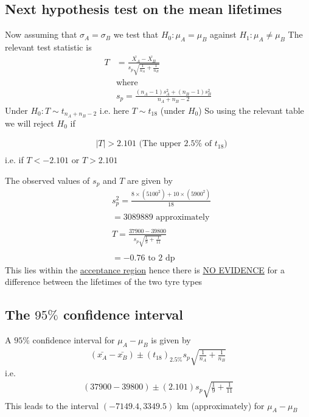 \documentclass[11pt]{article}
\begin{document}
\subsection{Next hypothesis test on the mean lifetimes}
Now assuming that $\sigma_{A}=\sigma_{B}$ we test that $H_{0}: \mu_{A} = \mu_{B}$ against $H_{1}: \mu_{A} \neq \mu_{B}$ The relevant test statistic is
\begin{align*}
  T &= \frac{\bar{X_{A}}-\bar{X_{B}}} {s_{p}\sqrt{\frac{1}{n_{A}}+\frac{1}{n_{B}}}} \\
  & \text{where} \\
  & s_{p} = \frac{(n_{A}-1)s_{A}^{2} +(n_{B}-1)s_{B}^{2} }{n_{A}+n_{B}-2}
\end{align*}
Under $H_{0}: T \sim t_{n_{A}+n_{B}-2}$ i.e. here $T \sim t_{18}$ (under $H_{0}$)
So using the relevant table we will reject $H_{0}$ if

\begin{align*}
  & \lvert T \rvert >2.101 \text{ (The upper $2.5\% $ of $t_{18}$)} \\
\end{align*}
   i.e. if $T<-2.101$ or $T>2.101$

The observed values of $s_{p}$ and $T$ are given by
\begin{align*}
  & s_{p}^{2} = \frac{8 \times (5100^{2}) + 10 \times (5900^{2})}{18} \\ \\
              &= 3089889 \text{ approximately} \\ \\
  & T = \frac{37900-39800}{s_{p} \sqrt{\frac{1}{9} + \frac{1}{11}}} \\ \\
  &= -0.76 \text{ to 2 dp}
\end{align*}
This lies within the \underline{acceptance region} hence there is \underline{NO EVIDENCE} for a difference between the lifetimes of the two tyre types

\subsection{The $95\%$ confidence interval}
A  $95\%$ confidence interval for $\mu_{A} - \mu_{B}$ is given by
\begin{align}
  (\bar{x_{A}} - \bar{x_{B}}) \pm (t_{18})_{2.5\%}s_{p}\sqrt{\frac{1}{n_{A}}+\frac{1}{n_{B}}}
\end{align}
i.e.
\begin{align}
  (37900-39800) \pm (2.101)s_{p}\sqrt{\frac{1}{9}+\frac{1}{11}}
\end{align}
This leads to the interval $\boxed{(-7149.4,3349.5)}$ km (approximately) for $\mu_{A}-\mu_{B}$
\end{document}
